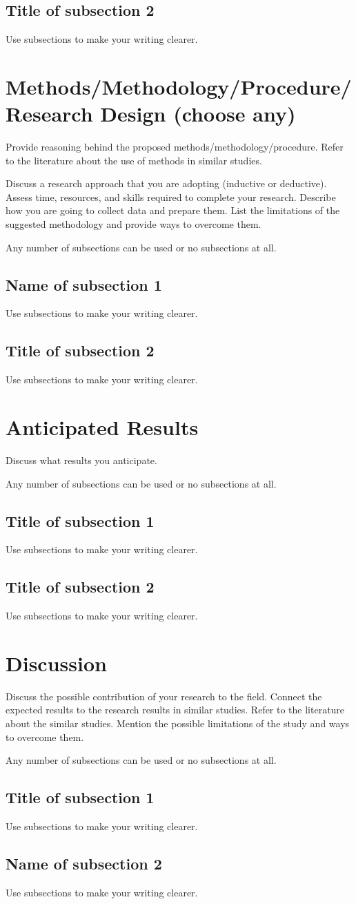 \documentclass[oneside,final,12pt,a4paper]{extreport}
\begin{document}
\subsection{Title of subsection 2}
Use subsections to make your writing clearer.
\section{Methods/Methodology/Procedure/Research Design (choose any)}
Provide reasoning behind the proposed methods/methodology/procedure. Refer to the literature about the use of methods in similar studies. 

Discuss a research approach that you are adopting (inductive or deductive). Assess time, resources, and skills required to complete your research. Describe how you are going to collect data and prepare them. List the limitations of the suggested methodology and provide ways to overcome them.


Any number of subsections can be used or no subsections at all.
\subsection{Name of subsection 1}
Use subsections to make your writing clearer.
\subsection{Title of subsection 2}
Use subsections to make your writing clearer. 
\section{Anticipated Results}
Discuss what results you anticipate. 

Any number of subsections can be used or no subsections at all.
\subsection{Title of subsection 1}
Use subsections to make your writing clearer.
\subsection{Title of subsection 2}
Use subsections to make your writing clearer.
\section{Discussion}
Discuss the possible contribution of your research to the field. Connect the expected results to the research results in similar studies. Refer to the literature about the similar studies. Mention the possible limitations of the study and ways to overcome them.

Any number of subsections can be used or no subsections at all.
\subsection{Title of subsection 1}
Use subsections to make your writing clearer.
\subsection{Name of subsection 2}
Use subsections to make your writing clearer.
\newpage
\printbibliography[heading=bibintoc,title={References}]
\end{document}
